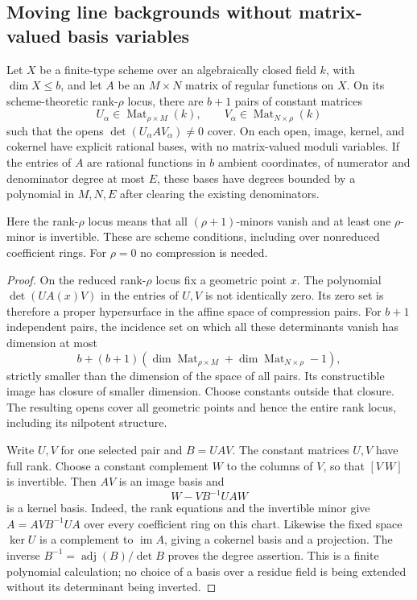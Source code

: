 \subsection{Moving line backgrounds without matrix-valued basis variables}

\begin{lemma}
\label{D:compressed-minor-background-charts}
Let $X$ be a finite-type scheme over an algebraically closed field
$k$, with $\dim X\leq b$, and let $A$ be an $M\times N$ matrix
of regular functions on $X$. On its scheme-theoretic rank-$\rho$
locus, there are $b+1$ pairs of constant matrices
\[
 U_\alpha\in\operatorname{Mat}_{\rho\times M}(k),\qquad
 V_\alpha\in\operatorname{Mat}_{N\times\rho}(k)
\]
such that the opens $\det(U_\alpha A V_\alpha)\ne0$ cover.
On each open, image, kernel, and cokernel have explicit rational
bases, with no matrix-valued moduli variables. If the entries
of $A$ are rational functions in $b$ ambient coordinates, of
numerator and denominator degree at most $E$, these bases have
degrees bounded by a polynomial in $M,N,E$ after clearing
the existing denominators.

Here the rank-$\rho$ locus means that all $(\rho+1)$-minors
vanish and at least one $\rho$-minor is invertible. These are
scheme conditions, including over nonreduced coefficient rings.
For $\rho=0$ no compression is needed.
\end{lemma}

\begin{proof}
On the reduced rank-$\rho$ locus fix a geometric point $x$.
The polynomial $\det(UA(x)V)$ in the entries of $U,V$ is not
identically zero. Its zero set is therefore a proper hypersurface
in the affine space of compression pairs. For $b+1$ independent
pairs, the incidence set on which all these determinants vanish
has dimension at most
\[
 b+(b+1)(\dim\operatorname{Mat}_{\rho\times M}
          +\dim\operatorname{Mat}_{N\times\rho}-1),
\]
strictly smaller than the dimension of the space of all pairs.
Its constructible image has closure of smaller dimension.
Choose constants outside that closure. The resulting opens
cover all geometric points and hence the entire rank locus,
including its nilpotent structure.

Write $U,V$ for one selected pair and $B=UAV$. The constant
matrices $U,V$ have full rank. Choose a constant complement
$W$ to the columns of $V$, so that $[V\ W]$ is invertible.
Then $AV$ is an image basis and
\[
                       W-VB^{-1}UAW                      \tag{B.MB.1}
\]
is a kernel basis. Indeed, the rank equations and the invertible
minor give $A=AVB^{-1}UA$ over every coefficient ring on this
chart. Likewise the fixed space $\ker U$ is a complement to
$\operatorname{im}A$, giving a cokernel basis and a projection.
The inverse $B^{-1}=\operatorname{adj}(B)/\det B$ proves the
degree assertion. This is a finite polynomial calculation;
no choice of a basis over a residue field is being extended
without its determinant being inverted.
\end{proof}

